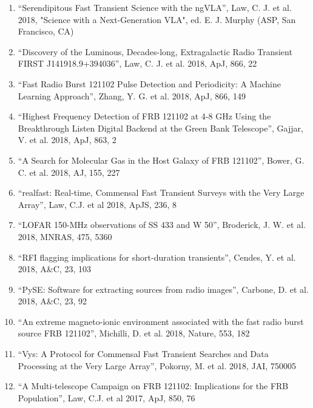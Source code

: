 \documentclass[11pt]{article}
\begin{document}
\begin{enumerate}

	\item ``Serendipitous Fast Transient Science with the ngVLA'', Law, C. J. et al. 2018, "Science with a Next-Generation VLA", ed. E. J. Murphy (ASP, San Francisco, CA)

    \item ``Discovery of the Luminous, Decades-long, Extragalactic Radio Transient FIRST J141918.9+394036'', Law, C. J. et al. 2018, ApJ, 866, 22

    \item ``Fast Radio Burst 121102 Pulse Detection and Periodicity: A Machine Learning Approach'', Zhang, Y. G. et al. 2018, ApJ, 866, 149

    \item ``Highest Frequency Detection of FRB 121102 at 4-8 GHz Using the Breakthrough Listen Digital Backend at the Green Bank Telescope'', Gajjar, V. et al. 2018, ApJ, 863, 2
    
    \item ``A Search for Molecular Gas in the Host Galaxy of FRB 121102'', Bower, G. C. et al. 2018, AJ, 155, 227
    
    \item ``realfast: Real-time, Commensal Fast Transient Surveys with the Very Large Array'', Law, C.J. et al 2018, ApJS, 236, 8

    \item ``LOFAR 150-MHz observations of SS 433 and W 50'', Broderick, J. W. et al. 2018, MNRAS, 475, 5360
    
    \item ``RFI flagging implications for short-duration transients'', Cendes, Y. et al. 2018, A\&C, 23, 103
    
    \item ``PySE: Software for extracting sources from radio images'', Carbone, D. et al. 2018, A\&C, 23, 92

    \item ``An extreme magneto-ionic environment associated with the fast radio burst source FRB 121102'', Michilli, D. et al. 2018, Nature, 553, 182
    
    \item ``Vys: A Protocol for Commensal Fast Transient Searches and Data Processing at the Very Large Array'', Pokorny, M. et al. 2018, JAI, 750005
    
    \item ``A Multi-telescope Campaign on FRB 121102: Implications for the FRB Population'', Law, C.J. et al 2017, ApJ, 850, 76


\end{enumerate}
\end{document}
